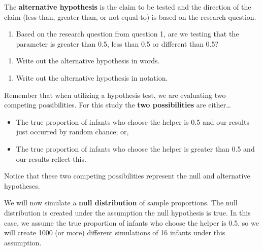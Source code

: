 \documentclass[
]{report}
\providecommand{\tightlist}{%
  \setlength{\itemsep}{0pt}\setlength{\parskip}{0pt}}
\begin{document}
\vspace{0.5in}

The \textbf{alternative hypothesis} is the claim to be tested and the direction of the claim (less than, greater than, or not equal to) is based on the research question.

\begin{enumerate}
\def\labelenumi{\arabic{enumi}.}
\setcounter{enumi}{8}
\tightlist
\item
  Based on the research question from question 1, are we testing that the parameter is greater than 0.5, less than 0.5 or different than 0.5?
\end{enumerate}

\vspace{0.4in}

\begin{enumerate}
\def\labelenumi{\arabic{enumi}.}
\setcounter{enumi}{9}
\tightlist
\item
  Write out the alternative hypothesis in words.
\end{enumerate}

\vspace{1in}

\begin{enumerate}
\def\labelenumi{\arabic{enumi}.}
\setcounter{enumi}{10}
\tightlist
\item
  Write out the alternative hypothesis in notation.
\end{enumerate}

\vspace{0.5in}

Remember that when utilizing a hypothesis test, we are evaluating two competing possibilities. For this study the \textbf{two possibilities} are either\ldots{}

\begin{itemize}
\item
  The true proportion of infants who choose the helper is 0.5 and our results just occurred by random chance; or,
\item
  The true proportion of infants who choose the helper is greater than 0.5 and our results reflect this.
\end{itemize}

Notice that these two competing possibilities represent the null and alternative hypotheses.

We will now simulate a \textbf{null distribution} of sample proportions. The null distribution is created under the assumption the null hypothesis is true. In this case, we assume the true proportion of infants who choose the helper is 0.5, so we will create 1000 (or more) different simulations of 16 infants under this assumption.
\end{document}
